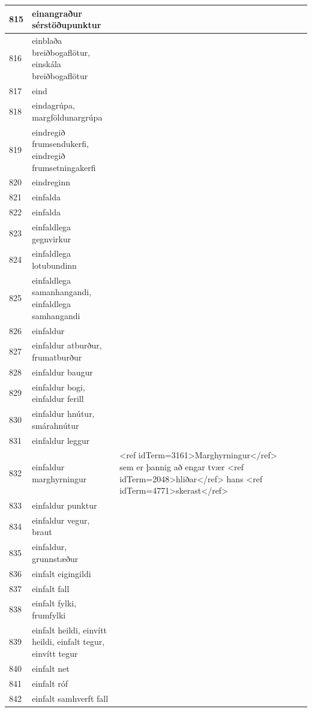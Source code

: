 \begin{longtable}{p{}|p{}|p{}|p{}|p{}}
\hline
815 & einangraður sérstöðupunktur &  &  &  \\
\hline
816 & einblaða breiðbogaflötur, einskála breiðbogaflötur &  &  &  \\
\hline
817 & eind &  &  &  \\
\hline
818 & eindagrúpa, margföldunargrúpa &  &  &  \\
\hline
819 & eindregið frumsendukerfi, eindregið frumsetningakerfi &  &  &  \\
\hline
820 & eindreginn &  &  &  \\
\hline
821 & einfalda &  &  &  \\
\hline
822 & einfalda &  &  &  \\
\hline
823 & einfaldlega gegnvirkur &  &  &  \\
\hline
824 & einfaldlega lotubundinn &  &  &  \\
\hline
825 & einfaldlega samanhangandi, einfaldlega samhangandi &  &  &  \\
\hline
826 & einfaldur &  &  &  \\
\hline
827 & einfaldur atburður, frumatburður &  &  &  \\
\hline
828 & einfaldur baugur &  &  &  \\
\hline
829 & einfaldur bogi, einfaldur ferill &  &  &  \\
\hline
830 & einfaldur hnútur, smárahnútur &  &  &  \\
\hline
831 & einfaldur leggur &  &  &  \\
\hline
832 & einfaldur marghyrningur & <ref idTerm=3161>Marghyrningur</ref> sem er þannig að engar tvær <ref idTerm=2048>hliðar</ref> hans <ref idTerm=4771>skerast</ref> &  &  \\
\hline
833 & einfaldur punktur &  &  &  \\
\hline
834 & einfaldur vegur, braut &  &  &  \\
\hline
835 & einfaldur, grunnstæður &  &  &  \\
\hline
836 & einfalt eigingildi &  &  &  \\
\hline
837 & einfalt fall &  &  &  \\
\hline
838 & einfalt fylki, frumfylki &  &  &  \\
\hline
839 & einfalt heildi, einvítt heildi, einfalt tegur, einvítt tegur &  &  &  \\
\hline
840 & einfalt net &  &  &  \\
\hline
841 & einfalt róf &  &  &  \\
\hline
842 & einfalt samhverft fall &  &  &  \\

\end{longtable}
